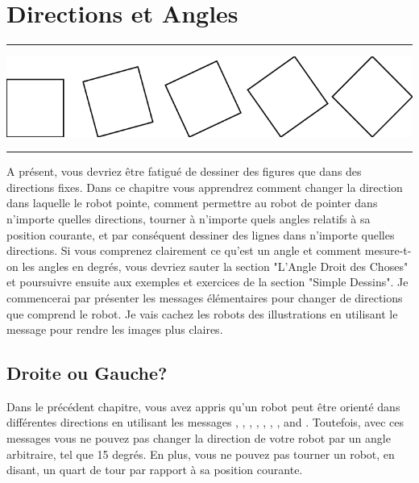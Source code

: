\documentclass[a4paper,10pt,twoside]{book}
\begin{document}
    \sloppy
\fi
\chapter{Directions et Angles}\label{cha:turning}

\noindent\hrule
\hfil \includegraphics[width=0.9\linewidth]{ChTurntitlePicture}\hfil
\vspace{0.2cm}
\noindent\hrule\vspace{1.5cm}


A pr\'esent, vous devriez \^etre fatigu\'e de dessiner des figures que dans des directions fixes. 
Dans ce chapitre vous apprendrez comment changer la direction dans laquelle le robot pointe, 
comment permettre au robot de pointer dans n'importe quelles directions, tourner \`a n'importe 
quels angles relatifs \`a sa position courante, et par cons\'equent dessiner des lignes dans n'importe 
quelles directions. Si vous comprenez clairement ce qu'est un angle et comment mesure-t-on les angles en degr\'es, 
vous devriez sauter la section "L'Angle Droit des Choses" et poursuivre ensuite aux exemples et exercices de la section "Simple Dessins".
Je commencerai par pr\'esenter les messages \'el\'ementaires pour changer de directions que comprend le robot. 
Je vais cachez les robots des illustrations en utilisant le message  pour rendre les images plus claires.

\newpage

\section{Droite ou Gauche?}

Dans le pr\'ec\'edent chapitre, vous avez appris qu'un robot peut \^etre orient\'e dans diff\'erentes directions 
en utilisant les messages , , , , ,
, , and . 
Toutefois, avec ces messages vous ne pouvez pas changer la direction de votre robot par un angle arbitraire, 
tel que 15 degr\'es. En plus, vous ne pouvez pas tourner un robot, en disant, un quart de tour par rapport \`a 
sa position courante.
\end{document}
